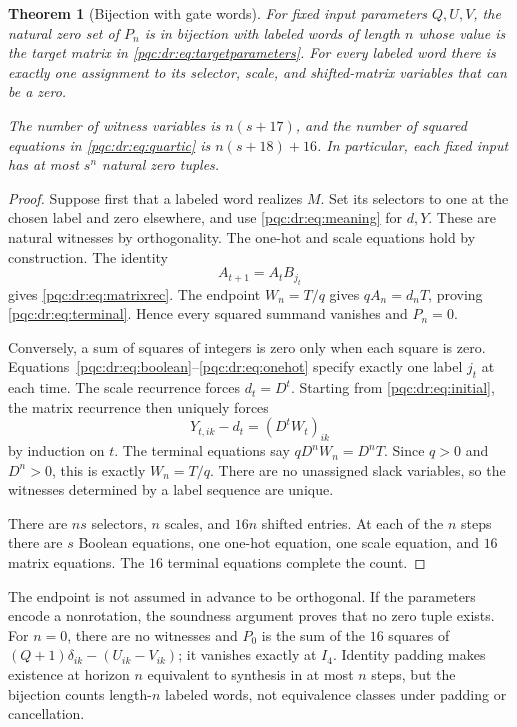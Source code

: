 \documentclass[11pt,letterpaper]{article}
\numberwithin{equation}{section}
\newtheorem{theorem}{Theorem}[section]
\theoremstyle{definition}
\theoremstyle{remark}
\begin{document}
\begin{theorem}[Bijection with gate words]
\label{pqc:dr:thm:certificate}
For fixed input parameters $Q,U,V$, the natural zero set of $P_n$ is
in bijection with labeled words of length $n$ whose value is the target
matrix in \eqref{pqc:dr:eq:targetparameters}. For every labeled word there
is exactly one assignment to its selector, scale, and shifted-matrix
variables that can be a zero.

The number of witness variables is $n(s+17)$, and the number of
squared equations in \eqref{pqc:dr:eq:quartic} is $n(s+18)+16$.
In particular, each fixed input has at most $s^n$ natural zero tuples.
\end{theorem}
\begin{proof}
Suppose first that a labeled word realizes $M$. Set its selectors to
one at the chosen label and zero elsewhere, and use \eqref{pqc:dr:eq:meaning}
for $d,Y$. These are natural witnesses by orthogonality. The one-hot
and scale equations hold by construction. The identity
\[
 A_{t+1}=A_tB_{j_t}
\]
gives \eqref{pqc:dr:eq:matrixrec}. The endpoint $W_n=T/q$ gives
$qA_n=d_nT$, proving \eqref{pqc:dr:eq:terminal}. Hence every squared summand
vanishes and $P_n=0$.

Conversely, a sum of squares of integers is zero only when each square
is zero. Equations~\eqref{pqc:dr:eq:boolean}--\eqref{pqc:dr:eq:onehot} specify
exactly one label $j_t$ at each time. The scale recurrence forces
$d_t=D^t$. Starting from \eqref{pqc:dr:eq:initial}, the matrix recurrence
then uniquely forces
\[
 Y_{t,ik}-d_t=(D^tW_t)_{ik}
\]
by induction on $t$. The terminal equations say $qD^nW_n=D^nT$.
Since $q>0$ and $D^n>0$, this is exactly $W_n=T/q$.
There are no unassigned slack variables, so the witnesses determined
by a label sequence are unique.

There are $ns$ selectors, $n$ scales, and $16n$ shifted entries.
At each of the $n$ steps there are $s$ Boolean equations, one one-hot
equation, one scale equation, and $16$ matrix equations. The $16$
terminal equations complete the count.
\end{proof}

The endpoint is not assumed in advance to be orthogonal. If the
parameters encode a nonrotation, the soundness argument proves that
no zero tuple exists. For $n=0$, there are no witnesses and
$P_0$ is the sum of the $16$ squares of
$(Q+1)\delta_{ik}-(U_{ik}-V_{ik})$; it vanishes exactly at $I_4$.
Identity padding makes existence at horizon $n$ equivalent to synthesis
in at most $n$ steps, but the bijection counts length-$n$ labeled words,
not equivalence classes under padding or cancellation.
\end{document}
